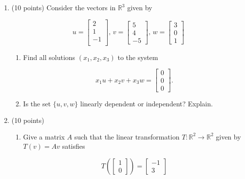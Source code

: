 \documentclass[12 pt]{report}
\begin{document}
\newpage

\begin{enumerate}

\item (10 points) Consider the vectors in $\mathbb{R}^3$ given by 


\[
u = \begin{bmatrix} 2 \\ 1 \\ -1 \\  \end{bmatrix}, \, v = \begin{bmatrix} 5 \\ 4 \\ -5 \end{bmatrix}, \, w = \begin{bmatrix} 3 \\ 0 \\ 1 \end{bmatrix}
\]

\begin{enumerate} \item Find all solutions $(x_1, x_2, x_3)$ to the system 

\begin{equation*} 
x_1 u + x_2 v + x_3 w = \begin{bmatrix} 0 \\ 0 \\ 0 \end{bmatrix}. 
\end{equation*}

\vfill

\item Is the set $\{u,v,w\}$ linearly dependent or independent? Explain. 

\vspace{150pt}

\end{enumerate}

\newpage

\item (10 points) \begin{enumerate} \item Give a matrix $A$ such that the linear transformation $T: \mathbb{R}^2 \to \mathbb{R}^2$ given by $T(v) = Av$ satisfies

\begin{equation*}
T\left(\begin{bmatrix} 1 \\ 0 \end{bmatrix}\right) = \begin{bmatrix} -1 \\ 3 \end{bmatrix} 
\end{equation*}


\end{enumerate}
\end{enumerate}
\end{document}
